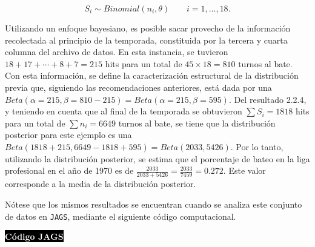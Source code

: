 \begin{Eje}
    \begin{equation*}
    S_i\sim Binomial (n_i,\theta) \ \ \ \ \ \ \ \ \ i=1,\ldots,18.
    \end{equation*}
    
    Utilizando un enfoque bayesiano, es posible sacar provecho de la informaci\'on recolectada al principio de la temporada, constituida por la tercera y cuarta columna del archivo de datos. En esta instancia, se tuvieron $18+17+\cdots+8+7=215$ hits para un total de $45\times 18= 810$ turnos al bate. Con esta informaci\'on, se define la caracterizaci\'on estructural de la distribuci\'on previa que, siguiendo las recomendaciones anteriores, est\'a dada por una $Beta(\alpha=215, \beta=810-215)=Beta(\alpha=215, \beta=595)$. Del resultado 2.2.4, y teniendo en cuenta que al final de la temporada se obtuvieron $\sum S_i =1818$ hits para un total de $\sum n_i =6649$ turnos al bate, se tiene que la distribuci\'on posterior para este ejemplo es una $Beta(1818+215,6649-1818+595)=Beta(2033, 5426)$. Por lo tanto, utilizando la distribuci\'on posterior, se estima que el porcentaje de bateo en la liga profesional en el a\~no de 1970 es de $\frac{2033}{2033+5426}=\frac{2033}{7459}=0.272$. Este valor corresponde a la media de la distribuci\'on posterior.
    
    N\'otese que los mismos resultados se encuentran cuando se analiza este conjunto de datos en \texttt{JAGS}, mediante el siguiente c\'odigo computacional.
    
    \colorbox{black}{\textcolor{white}{\textbf{C\'odigo JAGS}}}
\begin{knitrout}
\color{fgcolor}\begin{kframe}
\begin{alltt}
 \hlkwb{<-} 

 \hlkwb{<-} \hlstd{()\{}
   \hlopt{:} 
\hlstd{\{}
 \hlopt{~} 
\hlstd{\}}
 \hlopt{~} \hlstd{(}\hlstd{,}\hlstd{)}
\hlstd{\}}

 \hlkwb{<-} \hlstd{(}\hlstd{,} \hlstd{,} \hlstd{,}  \hlstd{,} \hlstd{,} \hlstd{,} \hlstd{,} \hlstd{,} \hlstd{,} \hlstd{,}  \hlstd{,} \hlstd{,} \hlstd{,} \hlstd{,}  \hlstd{,} \hlstd{,} \hlstd{,}  \hlstd{)}
 \hlkwb{<-} \hlstd{(}\hlstd{,} \hlstd{,} \hlstd{,} \hlstd{,} \hlstd{,} \hlstd{,} \hlstd{,}\hlstd{,} \hlstd{,} \hlstd{,} \hlstd{,} \hlstd{,} \hlstd{,} \hlstd{,} \hlstd{,} \hlstd{,} \hlstd{,} \hlstd{)}


\end{alltt}
\end{kframe}
\end{knitrout}
\end{Eje}
